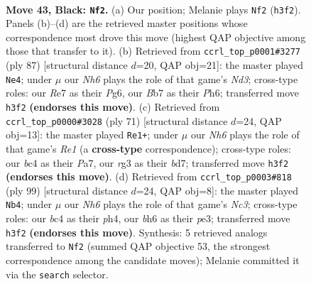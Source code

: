 \documentclass[11pt]{article}
\begin{document}
\clearpage

\begin{figure}[p]\centering
\begin{subfigure}{0.46\textwidth}\centering
\resizebox{\linewidth}{!}{%
\newchessgame
\chessboard[
  setfen={8/pb1pr3/7B/5k2/2B5/6Rn/PPK5/8 b - - 7 43},
  showmover=false,
  pgfstyle=straightmove, color=movearrow, markmove={h3-f2}
]}
\caption{}
\end{subfigure}\hfill
\begin{subfigure}{0.46\textwidth}\centering
\resizebox{\linewidth}{!}{%
\newchessgame
\chessboard[
  setfen={5k2/3R4/3nB1pp/8/8/6P1/6KP/1r6 b - - 10 44},
  showmover=false,
  pgfstyle=straightmove, color=movearrow, markmove={d6-e4}
]}
\caption{}
\end{subfigure}
\\[4pt]
\begin{subfigure}{0.46\textwidth}\centering
\resizebox{\linewidth}{!}{%
\newchessgame
\chessboard[
  setfen={4r1k1/p2B1p2/3B4/2P5/8/P4P2/8/3n2K1 b - - 1 36},
  showmover=false,
  pgfstyle=straightmove, color=movearrow, markmove={e8-e1}
]}
\caption{}
\end{subfigure}\hfill
\begin{subfigure}{0.46\textwidth}\centering
\resizebox{\linewidth}{!}{%
\newchessgame
\chessboard[
  setfen={8/5k2/r1n4p/8/6PP/4P1K1/p1R5/B7 b - - 5 50},
  showmover=false,
  pgfstyle=straightmove, color=movearrow, markmove={c6-b4}
]}
\caption{}
\end{subfigure}
\caption{\textbf{Move 43, Black: \texttt{Nf2}.} (a) Our position; Melanie plays \texttt{Nf2} (\texttt{h3f2}). Panels (b)--(d) are the retrieved master positions whose correspondence most drove this move (highest QAP objective among those that transfer to it). (b) Retrieved from \texttt{ccrl\_top\_p0001\#3277} (ply 87) [structural distance $d$=20, QAP obj=21]: the master played \texttt{Ne4}; under $\mu$ our \emph{Nh6} plays the role of that game's \emph{Nd3}; cross-type roles: our \emph{R}e7 as their \emph{P}g6, our \emph{B}b7 as their \emph{P}h6; transferred move \texttt{h3f2} \textbf{(endorses this move)}. (c) Retrieved from \texttt{ccrl\_top\_p0000\#3028} (ply 71) [structural distance $d$=24, QAP obj=13]: the master played \texttt{Re1+}; under $\mu$ our \emph{Nh6} plays the role of that game's \emph{Re1} (a \textbf{cross-type} correspondence); cross-type roles: our \emph{b}c4 as their \emph{P}a7, our \emph{r}g3 as their \emph{b}d7; transferred move \texttt{h3f2} \textbf{(endorses this move)}. (d) Retrieved from \texttt{ccrl\_top\_p0003\#818} (ply 99) [structural distance $d$=24, QAP obj=8]: the master played \texttt{Nb4}; under $\mu$ our \emph{Nh6} plays the role of that game's \emph{Nc3}; cross-type roles: our \emph{b}c4 as their \emph{p}h4, our \emph{b}h6 as their \emph{p}e3; transferred move \texttt{h3f2} \textbf{(endorses this move)}. Synthesis: 5 retrieved analogs transferred to \texttt{Nf2} (summed QAP objective 53, the strongest correspondence among the candidate moves); Melanie committed it via the \texttt{search} selector.}
\label{fig:thought-m85}
\end{figure}
\end{document}
